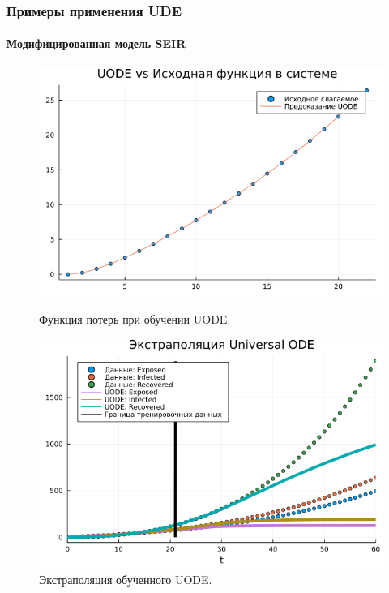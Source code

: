 \documentclass[10pt,pdf,hyperref={unicode}]{beamer}
\begin{document}
			\begin{frame}
				\frametitle{Примеры применения UDE} 
				\framesubtitle{Модифицированная модель SEIR}
				\begin{center}
					\begin{figure}[h!]
						\begin{minipage}{.45\textwidth}
							\includegraphics[width=\linewidth]{uode_estimated_exposure.png}
							\caption{Функция потерь при обучении UODE.}
							\centering
						\end{minipage}
						\begin{minipage}{.45\textwidth}
							\includegraphics[width=\linewidth]{universalode_extrapolation.png}
							\caption{Экстраполяция обученного UODE.}
							\centering
						\end{minipage}
						\centering
					\end{figure}
				\end{center}
			\end{frame}
			
\end{document}

